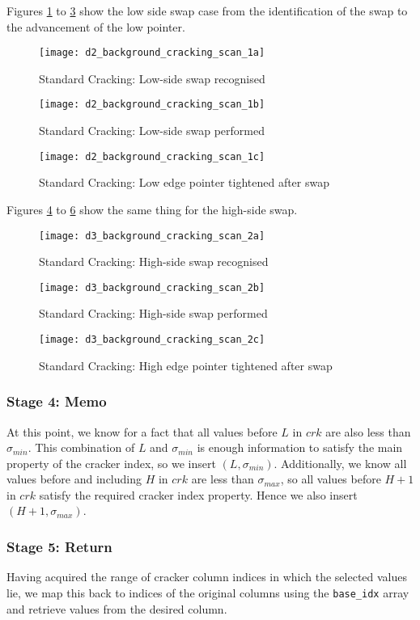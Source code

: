 Figures \ref{fig:cracking_scan_low_side_1} to \ref{fig:cracking_scan_low_side_3} show the low side swap case from the identification of the swap to the advancement of the low pointer.

\begin{figure}[H]
  \centering
  \texttt{[image: d2\_background\_cracking\_scan\_1a]}
  \caption{Standard Cracking: Low-side swap recognised}
  \label{fig:cracking_scan_low_side_1}
\end{figure}

\begin{figure}[H]
  \centering
  \texttt{[image: d2\_background\_cracking\_scan\_1b]}
  \caption{Standard Cracking: Low-side swap performed}
  \label{fig:cracking_scan_low_side_2}
\end{figure}

\begin{figure}[H]
  \centering
  \texttt{[image: d2\_background\_cracking\_scan\_1c]}
  \caption{Standard Cracking: Low edge pointer tightened after swap}
  \label{fig:cracking_scan_low_side_3}
\end{figure}

Figures \ref{fig:cracking_scan_high_side_1} to \ref{fig:cracking_scan_high_side_3} show the same thing for the high-side swap.

\begin{figure}[H]
  \centering
  \texttt{[image: d3\_background\_cracking\_scan\_2a]}
  \caption{Standard Cracking: High-side swap recognised}
  \label{fig:cracking_scan_high_side_1}
\end{figure}


\begin{figure}[H]
  \centering
  \texttt{[image: d3\_background\_cracking\_scan\_2b]}
  \caption{Standard Cracking: High-side swap performed}
  \label{fig:cracking_scan_high_side_2}
\end{figure}

\begin{figure}[H]
  \centering
  \texttt{[image: d3\_background\_cracking\_scan\_2c]}
  \caption{Standard Cracking: High edge pointer tightened after swap}
  \label{fig:cracking_scan_high_side_3}
\end{figure}

\subsubsection{Stage 4: Memo}

At this point, we know for a fact that all values before $L$ in $crk$ are also less than $\sigma _{min}$. This combination of $L$ and $\sigma _{min}$ is enough information to satisfy the main property of the cracker index, so we insert $(L, \sigma _{min})$. Additionally, we know all values before and including $H$ in $crk$ are less than $\sigma _{max}$, so all values before $H+1$ in $crk$ satisfy the required cracker index property. Hence we also insert $(H + 1, \sigma _{max})$.

\subsubsection{Stage 5: Return}

Having acquired the range of cracker column indices in which the selected values lie, we map this back to indices of the original columns using the \texttt{base\_idx} array and retrieve values from the desired column.
